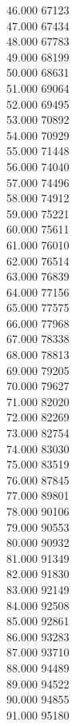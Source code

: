 { 46.000	67123 \\
 47.000	67434 \\
 48.000	67783 \\
 49.000	68199 \\
 50.000	68631 \\
 51.000	69064 \\
 52.000	69495 \\
 53.000	70892 \\
 54.000	70929 \\
 55.000	71448 \\
 56.000	74040 \\
 57.000	74496 \\
 58.000	74912 \\
 59.000	75221 \\
 60.000	75611 \\
 61.000	76010 \\
 62.000	76514 \\
 63.000	76839 \\
 64.000	77156 \\
 65.000	77575 \\
 66.000	77968 \\
 67.000	78338 \\
 68.000	78813 \\
 69.000	79205 \\
 70.000	79627 \\
 71.000	82020 \\
 72.000	82269 \\
 73.000	82754 \\
 74.000	83030 \\
 75.000	83519 \\
 76.000	87845 \\
 77.000	89801 \\
 78.000	90106 \\
 79.000	90553 \\
 80.000	90932 \\
 81.000	91349 \\
 82.000	91830 \\
 83.000	92149 \\
 84.000	92508 \\
 85.000	92861 \\
 86.000	93283 \\
 87.000	93710 \\
 88.000	94489 \\
 89.000	94522 \\
 90.000	94855 \\
 91.000	95180 \\
}

